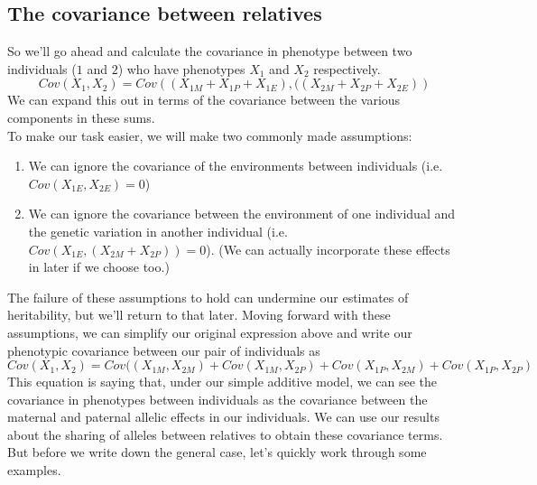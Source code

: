\subsection{The covariance between relatives}
So we'll go ahead and calculate the covariance in phenotype between two individuals
($1$ and $2$) who have phenotypes $X_1$ and $X_2$ respectively.
\begin{equation}
Cov(X_1,X_2) =
Cov\left((X_{1M}+X_{1P}+X_{1E}),((X_{2M}+X_{2P}+X_{2E}) \right)
\end{equation}
We can expand this out in terms of the covariance between the various
components in these sums.\\

To make our task easier, we will make two commonly made assumptions:
\begin{enumerate}
\item We can ignore the covariance of the environments
between individuals (i.e. $Cov(X_{1E},X_{2E})=0$)
\item We can ignore the covariance
between the environment of one individual and the
genetic variation in another individual (i.e. $Cov(X_{1E},(X_{2M}+X_{2P}))=0$). (We can actually incorporate these effects in later if we choose too.)
\end{enumerate}

The failure of these assumptions
to hold can undermine our estimates of heritability, but we'll
return to that later. Moving forward with these assumptions, we can
simplify our original expression above and write our phenotypic covariance between our pair of individuals as
\begin{equation}
Cov(X_1,X_2) =
Cov((X_{1M},X_{2M})+Cov(X_{1M},X_{2P})+Cov(X_{1P},X_{2M})
+Cov(X_{1P},X_{2P}) \label{cov_rels_1}
\end{equation}
This equation is saying that, under our simple additive model, we can see the
covariance in phenotypes between individuals as the covariance between
the maternal and paternal allelic effects in our individuals. We can use our results about
the sharing of alleles between relatives to obtain these covariance terms.
But before we write down the general case, let's quickly work through some
examples. \\

